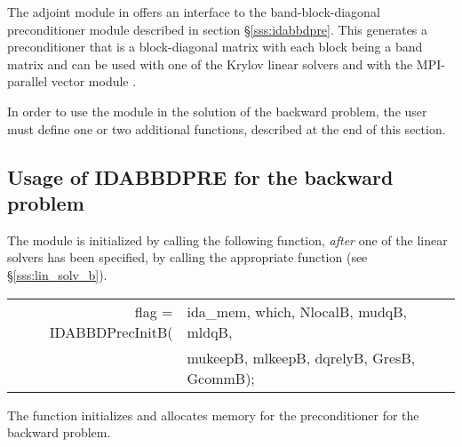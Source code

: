 The adjoint module in {\idas} offers an interface to the band-block-diagonal
preconditioner module {\idabbdpre} described in section \S\ref{sss:idabbdpre}.
This generates a preconditioner that is a block-diagonal matrix with each
block being a band matrix and can be used with one of the Krylov linear solvers
and with the MPI-parallel vector module {\nvecp}.

In order to use the {\idabbdpre} module in the solution of the backward problem,
the user must define one or two additional functions, described at the end of this section. 

\subsection{Usage of IDABBDPRE for the backward problem}
The {\idabbdpre} module is initialized by calling the following function,
{\em after} one of the {\idaspils} linear solvers has been specified,
by calling the appropriate function (see \S\ref{sss:lin_solv_b}).
{
  \begin{tabular}[t]{@{}r@{}l@{}}
    flag = IDABBDPrecInitB(&ida\_mem, which, NlocalB, mudqB, mldqB,\\
                           &mukeepB, mlkeepB, dqrelyB, GresB, GcommB);
  \end{tabular}
}
{
  The function  initializes and allocates
  memory for the {\idabbdpre} preconditioner for the backward problem.
}
